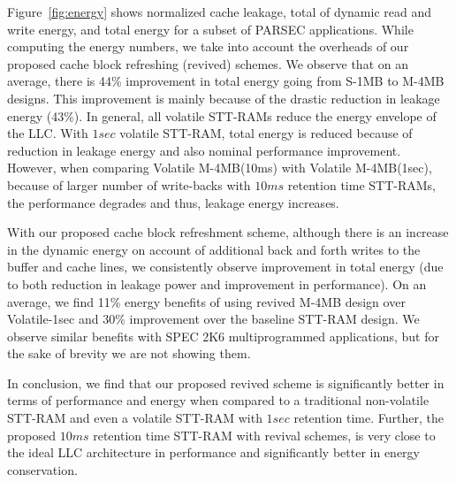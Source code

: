 Figure~\ref{fig:energy} shows normalized cache leakage, total of dynamic read and write energy, and total energy for a subset of PARSEC applications. While computing the energy numbers, we take into account the overheads of our proposed cache block refreshing (revived) schemes.
We observe that on an average, there is 44\% improvement in total energy going from S-1MB to
M-4MB designs. This improvement is mainly because of the drastic reduction in leakage energy (43\%).
In general, all volatile STT-RAMs reduce the energy envelope of the LLC. With $1sec$ volatile STT-RAM,
total energy is reduced because of reduction in leakage energy and also nominal performance improvement.
However, when comparing
Volatile M-4MB(10ms) with Volatile M-4MB(1sec), because of larger number of write-backs with $10ms$ retention time STT-RAMs, the performance degrades and thus, leakage energy increases.

With our proposed cache block refreshment scheme, although there is an increase in the dynamic energy on account of additional back and forth writes to the buffer and cache lines, we consistently observe improvement in total energy (due to both reduction in leakage power and improvement in performance). On an average, we find 11\% energy benefits of using revived M-4MB design over Volatile-1sec and 30\% improvement over the baseline STT-RAM design. We observe similar benefits with SPEC 2K6 multiprogrammed applications, but for the sake of brevity we are not showing them.


In conclusion, we find that our proposed revived scheme is significantly better in terms of performance and energy
when compared to a traditional non-volatile STT-RAM and even a volatile STT-RAM with $1sec$ retention time.
Further, the proposed $10ms$ retention time STT-RAM with revival schemes, is very close to the ideal LLC architecture in performance and significantly better in energy conservation.



